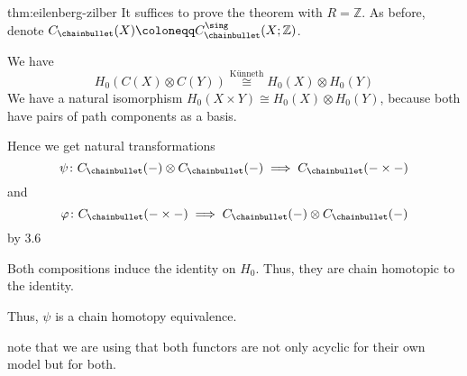 \begin{refproof}{thm:eilenberg-zilber}
  It suffices to prove the theorem with $R = \mathbb{Z}$.
  As before, denote $C_{\chainbullet}(X) \coloneqq C_{\chainbullet}^{\sing}(X ; \mathbb{Z})$.

  We have
  \[
    H_0(C(X) \otimes C(Y))
    \stackrel{\text{Künneth}}{\cong}
    H_0(X) \otimes H_0(Y)
  \]
  We have a natural isomorphism
  $H_0(X \times Y) \cong H_0(X) \otimes H_0(Y)$,
  because both have pairs of path components as a basis.

  Hence we get natural transformations
  \[
    \psi \colon  C_{\chainbullet}(\blank) \otimes C_{\chainbullet}(\blank) \implies C_{\chainbullet}( \blank \times  \blank )
  \]
  and
  \[
  \varphi  \colon  C_{\chainbullet}( \blank \times  \blank ) \implies C_{\chainbullet} ( \blank ) \otimes  C_{\chainbullet} ( \blank )
  \]
  by 3.6

  Both compositions induce the identity on $H_0$.
  Thus, they are chain homotopic to the identity.

  Thus, $\psi $ is a chain homotopy equivalence.
\end{refproof}

\begin{oral}
  note that we are using that both functors are not
  only acyclic for their own model but for both.
\end{oral}

